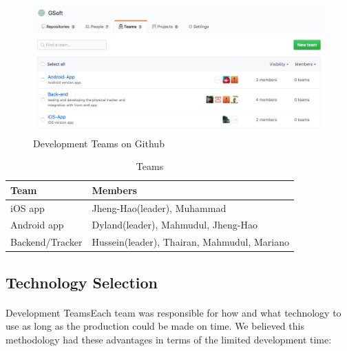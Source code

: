 \documentclass[12pt,a4paper]{article}
\begin{document}
        \begin{figure}[H]
          \centering
          \includegraphics[width=1\textwidth]{../assets/development-records-teams.png}
          \caption{Development Teams on Github}
          \label{fig:Development Teams}
        \end{figure}

        \begin{table}[H]
          \centering
            \begin{tabularx}{\textwidth}{l X}
              \hline
               Team & Members \\ \hline
               iOS app & Jheng-Hao(leader), Muhammad \\
               Android app & Dyland(leader), Mahmudul, Jheng-Hao \\ 
               Backend/Tracker  & Hussein(leader), Thairan, Mahmudul, Mariano \\
              \hline
            \end{tabularx}
            \caption[Table caption text]{Teams}
            \label{table:Teams}
        \end{table}        

      \subsection{Technology Selection} 

        \paragraph{}Development TeamsEach team was responsible for how and what technology to use as long as the production could be made on time. We believed this methodology had these advantages in terms of the limited development time:
\end{document}
